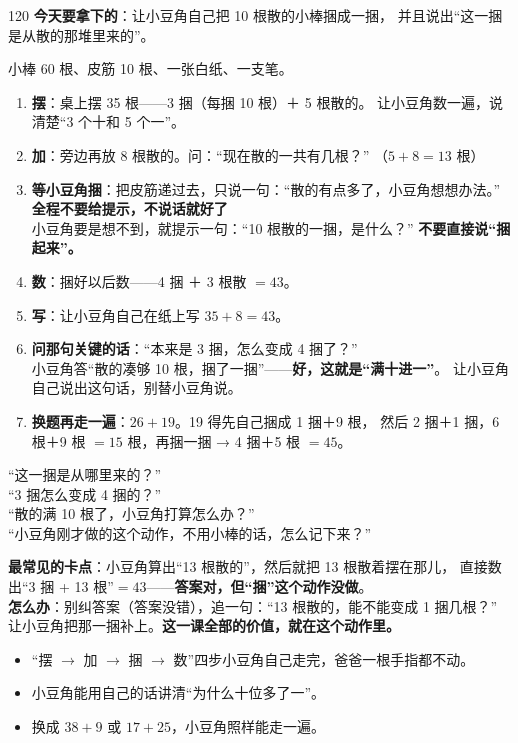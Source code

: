 \begin{lesson}{1}{20}
\textbf{今天要拿下的}：让小豆角自己把 10 根散的小棒捆成一捆，
并且说出“这一捆是从散的那堆里来的”。

\begin{materials}
小棒 60 根、皮筋 10 根、一张白纸、一支笔。
\end{materials}

\begin{enumerate}
  \item \textbf{摆}：桌上摆 35 根——3 捆（每捆 10 根）＋ 5 根散的。
        让小豆角数一遍，说清楚“3 个十和 5 个一”。
  \item \textbf{加}：旁边再放 8 根散的。问：“现在散的一共有几根？”
        （$5+8=13$ 根）
  \item \textbf{等小豆角捆}：把皮筋递过去，只说一句：“散的有点多了，小豆角想想办法。”
        \textbf{全程不要给提示，不说话就好了}\\
        小豆角要是想不到，就提示一句：“10 根散的一捆，是什么？”
        \textbf{不要直接说“捆起来”。}
  \item \textbf{数}：捆好以后数——4 捆 ＋ 3 根散 $=43$。
  \item \textbf{写}：让小豆角自己在纸上写 $35+8=43$。
  \item \textbf{问那句关键的话}：“本来是 3 捆，怎么变成 4 捆了？”\\
        小豆角答“散的凑够 10 根，捆了一捆”——\textbf{好，这就是“满十进一”}。
        让小豆角自己说出这句话，别替小豆角说。
  \item \textbf{换题再走一遍}：$26+19$。19 得先自己捆成 1 捆＋9 根，
        然后 2 捆＋1 捆，6 根＋9 根 $=15$ 根，再捆一捆 →
        4 捆＋5 根 $=45$。
\end{enumerate}

\begin{saybox}
“这一捆是从哪里来的？”\\
“3 捆怎么变成 4 捆的？”\\
“散的满 10 根了，小豆角打算怎么办？”\\
“小豆角刚才做的这个动作，不用小棒的话，怎么记下来？”
\end{saybox}

\begin{pitbox}
\textbf{最常见的卡点}：小豆角算出“13 根散的”，然后就把 13 根散着摆在那儿，
直接数出“3 捆 + 13 根”$=43$——\textbf{答案对，但“捆”这个动作没做}。\\
\textbf{怎么办}：别纠答案（答案没错），追一句：“13 根散的，能不能变成 1 捆几根？”
让小豆角把那一捆补上。\textbf{这一课全部的价值，就在这个动作里。}
\end{pitbox}

\begin{passbox}
\begin{itemize}
  \item “摆 $\to$ 加 $\to$ 捆 $\to$ 数”四步小豆角自己走完，爸爸一根手指都不动。
  \item 小豆角能用自己的话讲清“为什么十位多了一”。
  \item 换成 $38+9$ 或 $17+25$，小豆角照样能走一遍。
\end{itemize}
\end{passbox}
\end{lesson}

